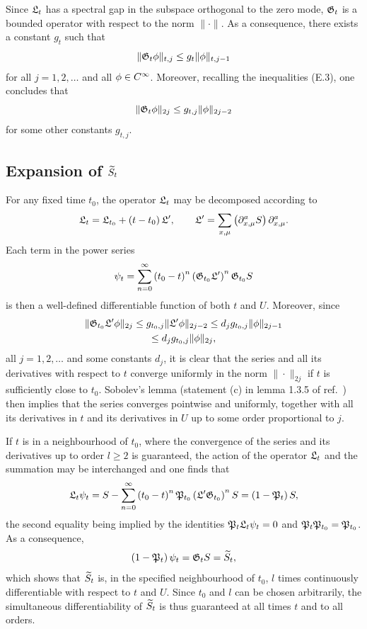 Since $\mathfrak{L}_t$ has a spectral gap in the subspace orthogonal to
the zero mode, $\mathfrak{G}_t$ is a bounded operator with respect
to the norm $\|\cdot\|$.
As a consequence, there exists a constant $g_t$ such that
\begin{equation}
  \|\mathfrak{G}_t\phi\|_{t,j}\leq g_t\|\phi\|_{t,j-1}
\end{equation}
for all $j=1,2,\ldots$ and all $\phi\in C^{\infty}$. Moreover,
recalling the inequalities (E.3), one concludes that
\begin{equation}
  \|\mathfrak{G}_t\phi\|_{2j}\leq g_{t,j}\|\phi\|_{2j-2}
\end{equation}
for some other constants $g_{t,j}$.


\subsection{Expansion of $\widetilde{S}_t$}

For any fixed time $t_0$, the operator $\mathfrak{L}_t$ may be
decomposed according to
\begin{equation}
  \mathfrak{L}_t=\mathfrak{L}_{t_0}+\left(t-t_0\right)\mathfrak{L}',
  \qquad
  \mathfrak{L}'=\sum_{x,\mu}
  \left(\partial^a_{x,\mu}S\right)\partial^a_{x,\mu}.
\end{equation}
Each term in the power series
\begin{equation}
  \psi_t=\sum_{n=0}^{\infty}\left(t_0-t\right)^n
  \left(\mathfrak{G}_{t_0}\mathfrak{L}'\right)^n\mathfrak{G}_{t_0} S
\end{equation}
is then a well-defined differentiable function of both $t$ and $U$.
Moreover, since
\begin{multline}
  \|\mathfrak{G}_{t_0}\mathfrak{L}'\phi\|_{2j}\leq g_{t_0,j}\|\mathfrak{L}'\phi\|_{2j-2}\leq
  d_jg_{t_0,j}\|\phi\|_{2j-1}\\
  \leq d_jg_{t_0,j}\|\phi\|_{2j},
\end{multline}
all $j=1,2,\ldots$ and some constants $d_j$, it is clear that the
series and all its derivatives with respect to $t$
converge uniformly in the norm $\|\cdot\|_{2j}$
if $t$ is sufficiently close to $t_0$.
Sobolev's lemma (statement (c) in lemma 1.3.5 of
ref.~\cite{Gilkey}) then implies
that the series converges pointwise and uniformly, together
with all its derivatives in $t$ and its derivatives in $U$ up
to some order proportional to $j$.

If $t$ is in a neighbourhood of $t_0$,
where the convergence of the
series and its derivatives up to order $l\geq2$
is guaranteed, the action of the
operator $\mathfrak{L}_t$ and the summation may be interchanged
and one finds that
\begin{equation}
  \mathfrak{L}_t\psi_t=S-\sum_{n=0}^{\infty}\left(t_0-t\right)^n
  \mathfrak{P}_{t_0}\left(\mathfrak{L}'\mathfrak{G}_{t_0}\right)^nS
  =\left(1-\mathfrak{P}_t\right)S,
\end{equation}
the second equality being implied by the identities $\mathfrak{P}_t\mathfrak{L}_t\psi_t=0$
and $\mathfrak{P}_t\mathfrak{P}_{t_0}=\mathfrak{P}_{t_0}$.
As a consequence,
\begin{equation}
  \left(1-\mathfrak{P}_t\right)\psi_t=\mathfrak{G}_t S=\widetilde{S}_t,
\end{equation}
which shows that $\widetilde{S}_t$ is,
in the specified neighbourhood of $t_0$,
$l$ times continuously differentiable with respect to $t$ and $U$.
Since $t_0$ and $l$ can be chosen arbitrarily, the
simultaneous differentiability
of $\widetilde{S}_t$ is thus guaranteed at all times $t$ and to all orders.

